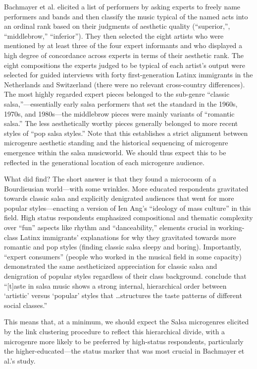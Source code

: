 \documentclass[a4paper,12pt]{extarticle}
\begin{document}
Bachmayer et al. elicited a list of performers by asking experts to freely name performers and bands and then classify the music typical of the named acts into an ordinal rank based on their judgments of aesthetic quality (``superior,'', ``middlebrow,'' ``inferior''). They then selected the eight artists who were mentioned by at least three of the four expert informants and who displayed a high degree of concordance across experts in terms of their aesthetic rank. The eight compositions the experts judged to be typical of each artist's output were selected for guided interviews with forty first-generation Latinx immigrants in the Netherlands and Switzerland (there were no relevant cross-country differences). The most highly regarded expert pieces belonged to the sub-genre ``classic salsa,''---essentially early salsa performers that set the standard in the 1960s, 1970s, and 1980s---the middlebrow pieces were mainly variants of ``romantic salsa.'' The less aesthetically worthy pieces generally belonged to more recent styles of ``pop salsa styles.'' Note that this establishes a strict alignment between microgenre aesthetic standing and the historical sequencing of microgenre emergence within the salsa musicworld. We should thus expect this to be reflected in the generational location of each microgenre audience.

What did \citet{Bachmayer2014-pk} find? The short answer is that they found a microcosm of a Bourdieusian world---with some wrinkles. More educated respondents gravitated towards classic salsa and explicitly denigrated audiences that went for more popular styles---enacting a version of Ien Ang's \citeyearpar{ang2000dallas} ``ideology of mass culture'' in this field. High status respondents emphasized compositional and thematic complexity over ``fun'' aspects like rhythm and ``danceability,'' elements crucial in working-class Latinx immigrants' explanations for why they gravitated towards more romantic and pop styles (finding classic salsa sleepy and boring). Importantly, ``expert consumers'' (people who worked in the musical field in some capacity) demonstrated the same aestheticized appreciation for classic salsa and denigration of popular styles regardless of their class background. \citep[][62]{Bachmayer2014-pk} conclude that ``[t]aste in salsa music shows a strong internal, hierarchical order between `artistic' versus `popular' styles that \ldots structures the taste patterns of different social classes.'' 

This means that, at a minimum, we should expect the Salsa microgenres elicited by the link clustering procedure to reflect this hierarchical divide, with a microgenre more likely to be preferred by high-status respondents, particularly the higher-educated---the status marker that was most crucial in Bachmayer et al.'s study. 
\end{document}
